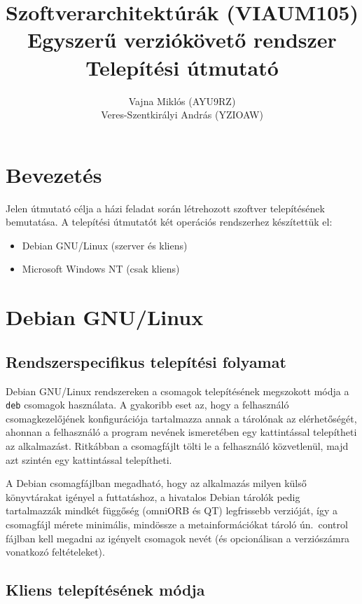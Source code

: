 \documentclass[a4paper,12pt]{article}
\title{Szoftverarchitektúrák (VIAUM105)\\Egyszerű verziókövető rendszer\\Telepítési útmutató}
\author{Vajna Miklós (AYU9RZ)\\Veres-Szentkirályi András (YZIOAW)}
\begin{document}
\maketitle
\thispagestyle{empty}
\lstset{basicstyle=\ttfamily, breaklines=true, frame=single, tabsize=2}

\pagebreak
\onehalfspacing
\section{Bevezetés}

Jelen útmutató célja a házi feladat során létrehozott szoftver telepítésének
bemutatása. A telepítési útmutatót két operációs rendszerhez készítettük el:

\begin{itemize}
\item Debian GNU/Linux (szerver és kliens)
\item Microsoft Windows NT (csak kliens)
\end{itemize}

\section{Debian GNU/Linux}

\subsection{Rendszerspecifikus telepítési folyamat}

Debian GNU/Linux rendszereken a csomagok telepítésének megszokott módja a
\verb|deb| csomagok használata. A gyakoribb eset az, hogy a felhasználó
csomagkezelőjének konfigurációja tartalmazza annak a tárolónak az elérhetőségét,
ahonnan a felhasználó a program nevének ismeretében egy kattintással telepítheti
az alkalmazást. Ritkábban a csomagfájlt tölti le a felhasználó közvetlenül,
majd azt szintén egy kattintással telepítheti.

A Debian csomagfájlban megadható, hogy az alkalmazás milyen külső könyvtárakat
igényel a futtatáshoz, a hivatalos Debian tárolók pedig tartalmazzák mindkét
függőség (omniORB és QT) legfrissebb verzióját, így a csomagfájl mérete minimális,
mindössze a metainformációkat tároló ún.\ control fájlban kell megadni az igényelt
csomagok nevét (és opcionálisan a verziószámra vonatkozó feltételeket).

\subsection{Kliens telepítésének módja}
\end{document}
